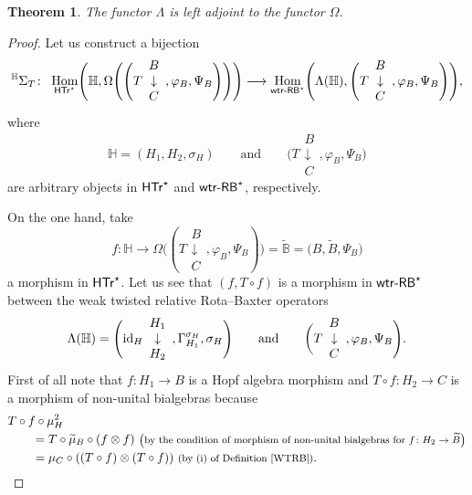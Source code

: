 \documentclass[pdftex]{sigma}
\numberwithin{equation}{section}
\newtheorem{Theorem}{Theorem}[section]
\DeclareMathOperator{\Hom}{Hom}
\begin{document}
\begin{Theorem}\label{adjpair}
The functor $\Lambda$ is left adjoint to the functor $\Omega$.
\end{Theorem}
\begin{proof}
Let us construct a bijection
\begin{gather*}
{}^{\mathbb{H}}\Sigma_{T}\colon\ \Hom_{{\sf HTr}^{\star}}\Biggl(\mathbb{H},\Omega\Biggl(\Biggl(T\begin{array}{c}B\\\downarrow\\C\end{array},\varphi_{B},\Psi_{B}\Biggr)\Biggr)\Biggr)\longrightarrow \Hom_{{\sf wtr}\textnormal{-}{\sf RB}^{\star}}\Biggl(\Lambda(\mathbb{H}),\Biggl(T\begin{array}{c}B\\\downarrow\\C\end{array},\varphi_{B},\Psi_{B}\Biggr)\Biggr),
\end{gather*}
where
\[
\mathbb{H}=(H_{1},H_{2},\sigma_{H}) \qquad \text{and}\qquad \Biggl(T\begin{array}{c}B\\\downarrow\\C\end{array},\varphi_{B},\Psi_{B}\Biggr)
\]
 are arbitrary objects in ${\sf HTr}^{\star}$ and ${\sf wtr}\textnormal{-}{\sf RB}^{\star}$, respectively.

On the one hand, take
\[
f\colon \mathbb{H}\rightarrow \Omega\Biggl((T\begin{array}{c}B\\\downarrow\\C\end{array},\varphi_{B},\Psi_{B})\Biggr)=\widetilde{\mathbb{B}}=\bigl(B,\widetilde{B},\Psi_{B}\bigr)
\]
 a morphism in ${\sf HTr}^{\star}$. Let us see that $(f,T\circ f)$ is a morphism in ${\sf wtr}\textnormal{-}{\sf RB}^{\star}$ between the weak twisted relative Rota--Baxter operators \[
 \Lambda(\mathbb{H})=\Biggl({\rm id}_{H}\begin{array}{c}H_{1}\\\downarrow\\H_{2}\end{array},\Gamma_{H_{1}}^{\sigma_{H}},\sigma_{H}\Biggr)
 \qquad \text{and} \qquad \biggl(T\begin{array}{c}B\\\downarrow\\C\end{array},\varphi_{B},\Psi_{B}\Biggr).
 \]
 First of all note that $f\colon H_{1}\rightarrow B$ is a Hopf algebra morphism and $T\circ f\colon H_{2}\rightarrow C$ is a morphism of non-unital bialgebras because
\begin{align*}
&T\circ f\circ \mu_{H}^{2}\\
&\qquad{}=T\circ\widetilde{\mu}_{B}\circ (f\otimes f)\
\text{\footnotesize\textnormal{\big(by the condition of morphism of non-unital bialgebras for $f\colon H_{2}\rightarrow \widetilde{B}$\big)}}\\
&\qquad{}=\mu_{C}\circ((T\circ f)\otimes(T\circ f))\ \text{\footnotesize\textnormal{(by (i) of Definition \ref{WTRB})}}.
\end{align*}


\end{proof}
\end{document}
